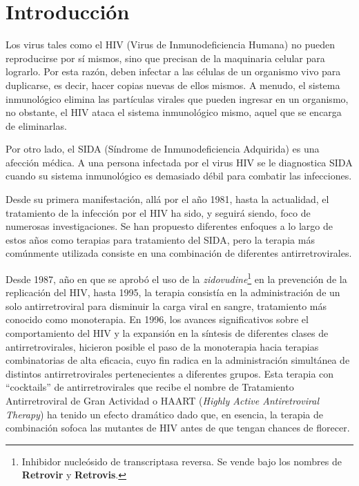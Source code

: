 \chapter{Introducci\'on}
  Los virus tales como el HIV (Virus de Inmunodeficiencia Humana) no pueden reproducirse por s\'i mismos, sino que precisan de la maquinaria celular para lograrlo. Por esta raz\'on, deben infectar a las c\'elulas de un organismo vivo para duplicarse, es decir, hacer copias nuevas de ellos mismos. A menudo, el sistema inmunol\'ogico elimina las part\'iculas virales que pueden ingresar en un organismo, no obstante, el HIV ataca el sistema inmunol\'ogico mismo, aquel que se encarga de eliminarlas.

  Por otro lado, el SIDA (S\'indrome de Inmunodeficiencia Adquirida) es una afecci\'on m\'edica. A una persona infectada por el virus HIV
  se le diagnostica SIDA cuando su sistema inmunol\'ogico es demasiado d\'ebil para combatir las infecciones.

  Desde su primera manifestaci\'on, all\'a por el a\~no 1981, hasta la actualidad, el tratamiento de la infecci\'on por el HIV ha 
  sido, y seguir\'a siendo, foco de numerosas investigaciones. Se han propuesto diferentes enfoques a lo largo de estos a\~nos como terapias para tratamiento del SIDA, pero la terapia m\'as com\'unmente utilizada consiste en una combinaci\'on de diferentes antirretrovirales. 
  
  Desde 1987, a\~no en que se aprob\'o el uso de la \textit{zidovudine}\footnote{Inhibidor nucle\'osido de transcriptasa reversa. Se vende bajo los nombres de \textbf{Retrovir} y \textbf{Retrovis}.} en la prevenci\'on de la replicaci\'on del HIV, hasta 1995, la terapia consist\'ia en la administraci\'on de un solo antirretroviral para disminuir la carga viral en sangre, tratamiento m\'as conocido como monoterapia. En 1996, los avances significativos sobre el comportamiento del HIV y la expansi\'on en la s\'intesis de diferentes clases de antirretrovirales, hicieron posible el paso de la monoterapia hacia terapias combinatorias de alta eficacia, cuyo fin radica en la administraci\'on simult\'anea de distintos antirretrovirales pertenecientes a diferentes grupos. Esta terapia con ``cocktails'' de antirretrovirales que recibe el nombre de Tratamiento Antirretroviral de Gran Actividad o HAART (\emph{Highly Active Antiretroviral Therapy})\cite{haart} ha tenido un efecto dram\'atico dado que, en esencia, la terapia de combinaci\'on sofoca las mutantes de HIV antes de que tengan chances de florecer.

